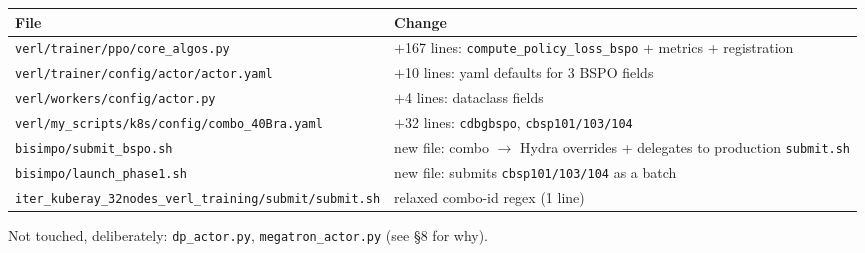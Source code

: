 \documentclass{article}
\begin{document}
\begin{tabular}{l|l}
\textbf{File} & \textbf{Change} \\
\hline
\texttt{verl/trainer/ppo/core\_algos.py} & $+$167 lines: \texttt{compute\_policy\_loss\_bspo} + metrics + registration \\
\texttt{verl/trainer/config/actor/actor.yaml} & $+$10 lines: yaml defaults for 3 BSPO fields \\
\texttt{verl/workers/config/actor.py} & $+$4 lines: dataclass fields \\
\texttt{verl/my\_scripts/k8s/config/combo\_40Bra.yaml} & $+$32 lines: \texttt{cdbgbspo}, \texttt{cbsp101/103/104} \\
\texttt{bisimpo/submit\_bspo.sh} & new file: combo $\to$ Hydra overrides + delegates to production \texttt{submit.sh} \\
\texttt{bisimpo/launch\_phase1.sh} & new file: submits \texttt{cbsp101/103/104} as a batch \\
\texttt{iter\_kuberay\_32nodes\_verl\_training/submit/submit.sh} & relaxed combo-id regex (1 line) \\
\end{tabular}

Not touched, deliberately: \texttt{dp\_actor.py}, \texttt{megatron\_actor.py}
(see \S8 for why).
\end{document}
